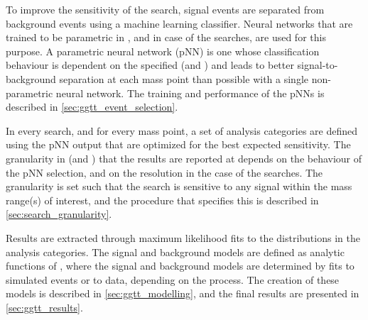To improve the sensitivity of the search, signal events are separated from background events using a machine learning classifier. Neural networks that are trained to be parametric in \mX, and \mY in case of the \XYH searches, are used for this purpose. A parametric neural network (pNN) is one whose classification behaviour is dependent on the specified \mX (and \mY) and leads to better signal-to-background separation at each mass point than possible with a single non-parametric neural network. The training and performance of the pNNs is described in \cref{sec:ggtt_event_selection}.

In every search, and for every mass point, a set of analysis categories are defined using the pNN output that are optimized for the best expected sensitivity. The granularity in \mX (and \mY) that the results are reported at depends on the behaviour of the pNN selection, and on the \mgg resolution in the case of the \XYggHtt searches. The granularity is set such that the search is sensitive to any signal within the mass range(s) of interest, and the procedure that specifies this is described in \cref{sec:search_granularity}.

Results are extracted through maximum likelihood fits to the \mgg distributions in the analysis categories. The signal and background models are defined as analytic functions of \mgg, where the signal and background models are determined by fits to simulated events or to data, depending on the process. The creation of these models is described in \cref{sec:ggtt_modelling}, and the final results are presented in \cref{sec:ggtt_results}.